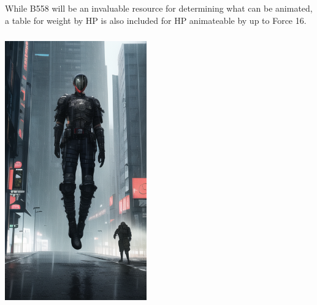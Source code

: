 \begin{multicols*}{3}
	While B558 will be an invaluable resource for determining what can be animated, a table for weight by HP is also included for HP animateable by up to Force 16.	
	
	\includegraphics*[width=6.1cm, height=11.7cm]{levitate.png}
	

\end{multicols*}
